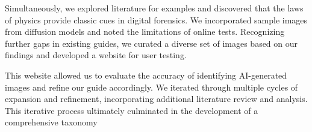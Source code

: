 Simultaneously, we explored literature for examples and discovered that the laws of physics provide classic cues in digital forensics. We incorporated sample images from diffusion models and noted the limitations of online tests. Recognizing further gaps in existing guides, we curated a diverse set of images based on our findings and developed a website for user testing.

This website allowed us to evaluate the accuracy of identifying AI-generated images and refine our guide accordingly. We iterated through multiple cycles of expansion and refinement, incorporating additional literature review and analysis. This iterative process ultimately culminated in the development of a comprehensive taxonomy











